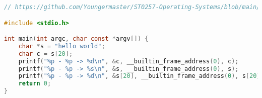 \begin{lstlisting}[language=C, caption=This script allow us to extract nmap generated info]
// https://github.com/Youngermaster/ST0257-Operating-Systems/blob/main/Challenges/Challenge_1/BufferOverflow/buffer_overflow.c

#include <stdio.h>

int main(int argc, char const *argv[]) {
    char *s = "hello world";
    char c = s[20];
    printf("%p - %p -> %d\n", &c, __builtin_frame_address(0), c);
    printf("%p - %p -> %s\n", &s, __builtin_frame_address(0), s);
    printf("%p - %p -> %d\n", &s[20], __builtin_frame_address(0), s[20]);
    return 0;
}
\end{lstlisting}


\clearpage